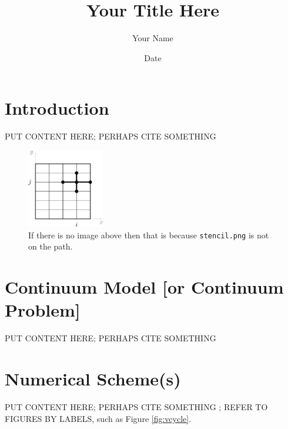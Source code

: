 \documentclass[11pt]{article}
\begin{document}
\title{Your Title Here}

\author{Your Name}

\date{Date}

\maketitle

\section{Introduction}  PUT CONTENT HERE; PERHAPS CITE SOMETHING \cite{einstein}

\begin{figure}[ht]
\centering
\includegraphics[width=0.3\textwidth]{stencil.png}  %
\caption{If there is no image above then that is because \texttt{stencil.png} is not on the path.}
\label{fig:stencil}
\end{figure}

\section{Continuum Model [or Continuum Problem]}  PUT CONTENT HERE; PERHAPS CITE SOMETHING \cite{ockendonetal}


\section{Numerical Scheme(s)}  PUT CONTENT HERE; PERHAPS CITE SOMETHING \cite{leveque}; REFER TO FIGURES BY LABELS, such as Figure \ref{fig:vcycle}.
\end{document}
